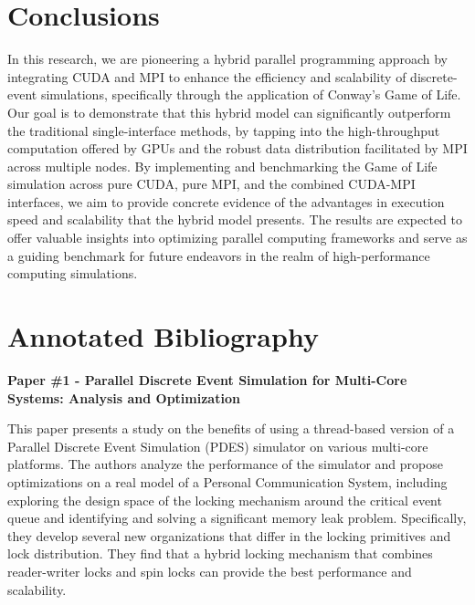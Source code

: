 \documentclass[11pt]{article}
\begin{document}
\section {Conclusions}\label{sched}

In this research, we are pioneering a hybrid parallel programming approach by integrating CUDA and MPI to enhance the efficiency and scalability of discrete-event simulations, specifically through the application of Conway's Game of Life. Our goal is to demonstrate that this hybrid model can significantly outperform the traditional single-interface methods, by tapping into the high-throughput computation offered by GPUs and the robust data distribution facilitated by MPI across multiple nodes. By implementing and benchmarking the Game of Life simulation across pure CUDA, pure MPI, and the combined CUDA-MPI interfaces, we aim to provide concrete evidence of the advantages in execution speed and scalability that the hybrid model presents. The results are expected to offer valuable insights into optimizing parallel computing frameworks and serve as a guiding benchmark for future endeavors in the realm of high-performance computing simulations.



\newpage 

\onecolumn
\section*{Annotated Bibliography}\label{annon} 

\vspace{1em}

\noindent \textbf{Paper \#1 - Parallel Discrete Event Simulation for Multi-Core Systems: Analysis and Optimization}

This paper presents a study on the benefits of using a thread-based version of a Parallel Discrete Event Simulation (PDES) simulator on various multi-core platforms. The authors analyze the performance of the simulator and propose optimizations on a real model of a Personal Communication System, including exploring the design space of the locking mechanism around the critical event queue and identifying and solving a significant memory leak problem. Specifically, they develop several new organizations that differ in the locking primitives and lock distribution. They find that a hybrid locking mechanism that combines reader-writer locks and spin locks can provide the best performance and scalability. 
\end{document}

